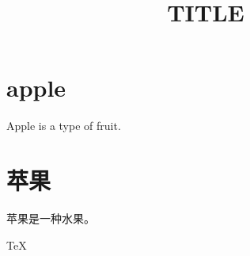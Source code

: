 ﻿\documentclass[a4paper]{article}
\title{TITLE}
\author{}
\date{}
\begin{document}
\tableofcontents


\section{apple}
Apple is a type of fruit.

\section{苹果}
苹果是一种水果。

\TeX
\end{document}
